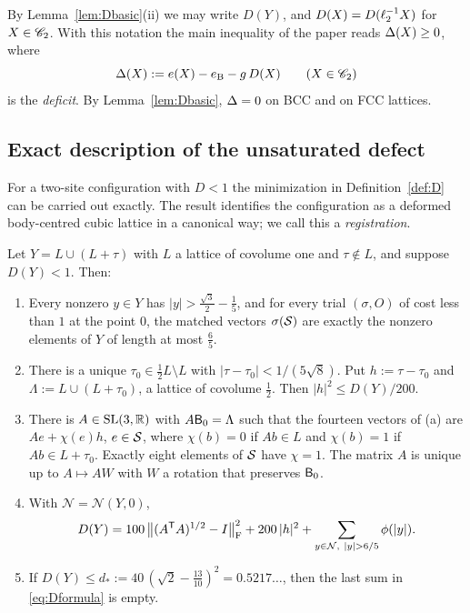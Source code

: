 By Lemma~\ref{lem:Dbasic}(ii) we may write $D(Y)$, and $D(X)=D(\ell_2^{-1}X)$ for $X\in\mathscr C_2$. With this notation the main inequality
of the paper reads $\Delta(X)\ge0$, where
\begin{equation}\label{eq:deficit}
  \Delta(X):=e(X)-e_{\mathrm B}-g\,D(X)\qquad(X\in\mathscr C_2)
\end{equation}
is the \emph{deficit}. By Lemma~\ref{lem:Dbasic}, $\Delta=0$ on BCC and on FCC lattices.

\subsection{Exact description of the unsaturated defect}\label{ssec:registration}

For a two-site configuration with $D<1$ the minimization in Definition~\ref{def:D} can be carried out exactly. The result identifies
the configuration as a deformed body-centred cubic lattice in a canonical way; we call this a \emph{registration}.

\begin{theorem}[Registration]\label{thm:registration}
Let $Y=L\cup(L+\tau)$ with $L$ a lattice of covolume one and $\tau\notin L$, and suppose $D(Y)<1$. Then:
\begin{enumerate}
\item[\textup{(a)}] Every nonzero $y\in Y$ has $|y|>\frac{\sqrt3}2-\frac15$, and for every trial $(\sigma,O)$ of cost less than $1$ at the
point $0$, the matched vectors $\sigma(\mathcal S)$ are exactly the nonzero elements of $Y$ of length at most $\frac65$.
\item[\textup{(b)}] There is a unique $\tau_0\in\frac12L\setminus L$ with $|\tau-\tau_0|<1/(5\sqrt8)$. Put $h:=\tau-\tau_0$ and
$\Lambda:=L\cup(L+\tau_0)$, a lattice of covolume $\frac12$. Then $|h|^2\le D(Y)/200$.
\item[\textup{(c)}] There is $A\in\mathrm{SL}(3,\mathbb R)$ with $A\mathsf B_0=\Lambda$ such that the fourteen vectors of \textup{(a)} are
$Ae+\chi(e)h$, $e\in\mathcal S$, where $\chi(b)=0$ if $Ab\in L$ and $\chi(b)=1$ if $Ab\in L+\tau_0$. Exactly eight elements of $\mathcal S$ have
$\chi=1$. The matrix $A$ is unique up to $A\mapsto AW$ with $W$ a rotation that preserves $\mathsf B_0$.
\item[\textup{(d)}] With $\mathcal N=\mathcal N(Y,0)$,
\begin{equation}\label{eq:Dformula}
  D(Y)=100\,\bigl\|(A^\T A)^{1/2}-I\bigr\|_\Fro^2+200\,|h|^2+\sum_{y\in\mathcal N,\ |y|>6/5}\phi(|y|).
\end{equation}
\item[\textup{(e)}] If $D(Y)\le d_*:=40\,(\sqrt2-\frac{13}{10})^2=0.5217\ldots$, then the last sum in \eqref{eq:Dformula} is empty.
\end{enumerate}
\end{theorem}


